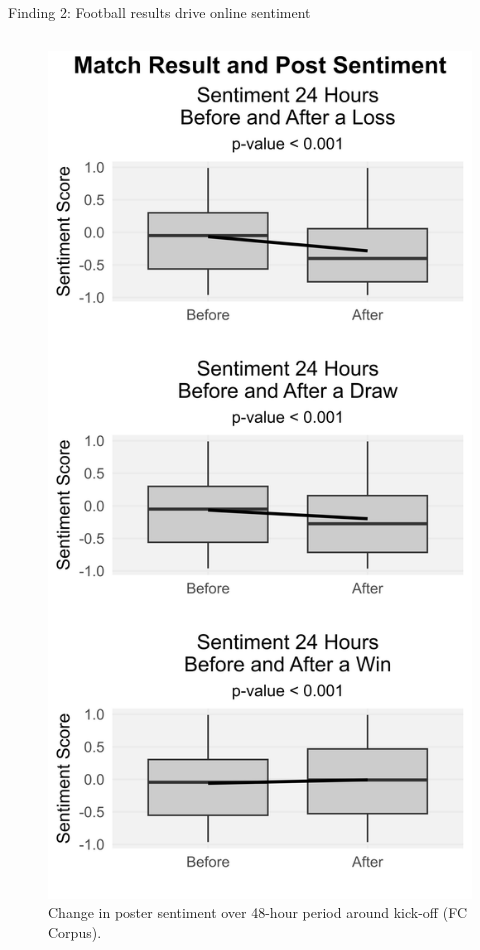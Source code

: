 \documentclass[10pt]{beamer}
\begin{document}
\begin{frame}{Finding 2: Football results drive online sentiment}
\begin{columns}
\begin{column}{0.3\textwidth}
\begin{figure}[t]
    \includegraphics[width=\columnwidth]{sentiment_before_after_matches_600dpi.jpg}
    \caption{Change in poster sentiment over 48-hour period around kick-off (FC Corpus).}
    \label{fig:sentiment_change_24}
\end{figure}

\end{column}
\end{columns}

\end{frame}
\end{document}
